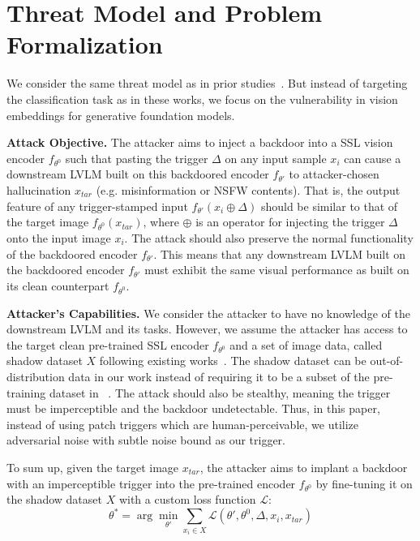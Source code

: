 \section{Threat Model and Problem Formalization}
\label{sec:threat_model}
We consider the same threat model as in prior studies~\cite{jia2022badencoder,tao2023distribution}. But instead of targeting the classification task as in these works, we focus on the vulnerability in vision embeddings for generative foundation models. 

\noindent \textbf{Attack Objective.} The attacker aims to inject a backdoor into a SSL vision encoder $f_{\theta^0}$ such that pasting the trigger $\varDelta$ on any input sample $x_i$ can cause a downstream LVLM built on this backdoored encoder $f_{\theta'}$ to attacker-chosen hallucination $x_{tar}$ (e.g. misinformation or NSFW contents). That is, the output feature of any trigger-stamped input $f_{\theta'}(x_i \oplus \varDelta)$ should be similar to that of the target image $f_{\theta^0}(x_{tar})$, where $\oplus$ is an operator for injecting the trigger $\varDelta$ onto the input image $x_i$. The attack should also preserve the normal functionality of the backdoored encoder $f_{\theta'}$. This means that any downstream LVLM built on the backdoored encoder $f_{\theta'}$ must exhibit the same visual performance as built on its clean counterpart $f_{\theta^0}$.

\noindent \textbf{Attacker's Capabilities.}
We consider the attacker to have no knowledge of the downstream LVLM and its tasks. However, we assume the attacker has access to the target clean pre-trained SSL encoder $f_{\theta^0}$ and a set of image data, called shadow dataset $X$ following existing works~\cite{jia2022badencoder, tao2023distribution}. The shadow dataset can be out-of-distribution data in our work instead of requiring it to be a subset of the pre-training dataset in ~\cite{jia2022badencoder, tao2023distribution}. The attack should also be stealthy, meaning the trigger must be imperceptible and the backdoor undetectable. Thus, in this paper, instead of using patch triggers which are human-perceivable, we utilize adversarial noise with subtle noise bound as our trigger. 

To sum up, given the target image $x_{tar}$, the attacker aims to implant a backdoor with an imperceptible trigger into the pre-trained encoder $f_{\theta^0}$ by fine-tuning it on the shadow dataset $X$ with a custom loss function $\mathcal{L}$: 
\[\theta^*=\arg\min_{\theta'} \sum_{x_i \in X} \mathcal{L}(\theta', \theta^0, \varDelta, x_i, x_{tar})\]